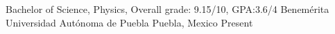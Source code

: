 
\begin{cventries}
  \cventry
    {Bachelor of Science, Physics, Overall grade: 9.15/10, GPA:3.6/4} %
    {Benem\'erita Universidad Aut\'onoma de Puebla} %
    {Puebla, Mexico} %
    {Present} %
    {}
\end{cventries}
